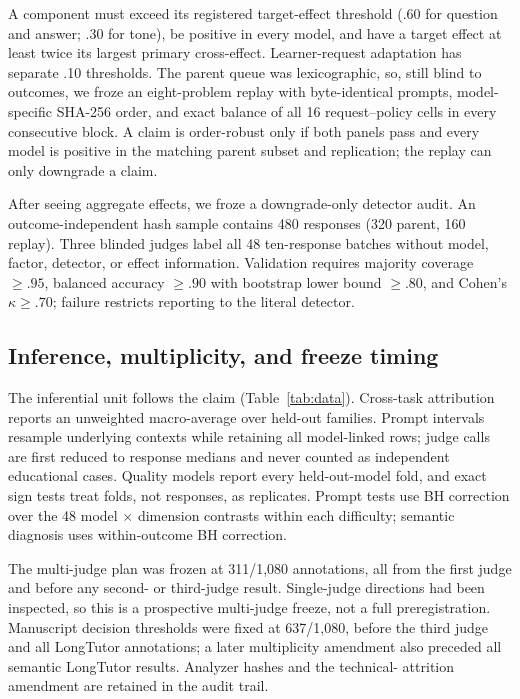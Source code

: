 \documentclass[11pt]{article}
\begin{document}
A component must exceed its registered target-effect threshold (.60 for question
and answer; .30 for tone), be positive in every model, and have a target effect at
least twice its largest primary cross-effect. Learner-request adaptation has
separate .10 thresholds. The parent queue was lexicographic, so, still blind to
outcomes, we froze an eight-problem replay with byte-identical prompts,
model-specific SHA-256 order, and exact balance of all 16 request--policy cells in
every consecutive block. A claim is order-robust only if both panels pass and
every model is positive in the matching parent subset and replication; the replay
can only downgrade a claim.

After seeing aggregate effects, we froze a downgrade-only detector audit. An
outcome-independent hash sample contains 480 responses (320 parent, 160 replay).
Three blinded judges label all 48 ten-response batches without model, factor,
detector, or effect information. Validation requires majority coverage $\geq
.95$, balanced accuracy $\geq .90$ with bootstrap lower bound $\geq .80$, and
Cohen's $\kappa\geq .70$; failure restricts reporting to the literal detector.

\subsection{Inference, multiplicity, and freeze timing}

The inferential unit follows the claim (Table~\ref{tab:data}). Cross-task
attribution reports an unweighted macro-average over held-out families. Prompt
intervals resample underlying contexts while retaining all model-linked rows;
judge calls are first reduced to response medians and never counted as
independent educational cases. Quality models report every held-out-model fold,
and exact sign tests treat folds, not responses, as replicates. Prompt tests use
BH correction over the 48 model $\times$ dimension contrasts within each
difficulty; semantic diagnosis uses within-outcome BH correction.

The multi-judge plan was frozen at 311/1,080 annotations, all from the first
judge and before any second- or third-judge result. Single-judge directions had
been inspected, so this is a prospective multi-judge freeze, not a full
preregistration. Manuscript decision thresholds were fixed at 637/1,080, before
the third judge and all LongTutor annotations; a later multiplicity amendment
also preceded all semantic LongTutor results. Analyzer hashes and the technical-
attrition amendment are retained in the audit trail.
\end{document}
